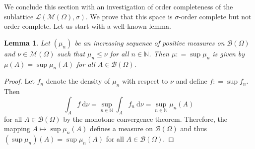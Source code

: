 \documentclass{amsart}
\numberwithin{equation}{section}
\newtheorem{lem}[thm]{Lemma}
\theoremstyle{remark}
\theoremstyle{definition}
\begin{document}
We conclude this section with an investigation of order completeness of 
the sublattice $\mathscr{L}(\mathscr{M}(\Omega),\sigma)$. 
We prove that this space is $\sigma$-order complete but not order complete.
Let us start with a well-known lemma.

\begin{lem}
\label{lem:monlimit}
	Let $(\mu_n)$ be an increasing sequence of positive measures on $\mathscr{B}(\Omega)$
	and $\nu\in\mathscr{M}(\Omega)$ such that
	$\mu_n \leq \nu$ for all $n\in{\mathds{N}}$.
	Then $\mu {\mathrel{\mathop:}=} \sup \mu_n$ is given by 
	$\mu(A) = \sup \mu_n(A)$ for all $A\in\mathscr{B}(\Omega)$.
\end{lem}
\begin{proof}
	Let $f_n$ denote the density of $\mu_n$ with respect to $\nu$ and define $f{\mathrel{\mathop:}=} \sup f_n$. Then
	\[ \int_A f {\:\mathrm{d}}\nu = \sup_{n\in{\mathds{N}}} \int_A f_n {\:\mathrm{d}}\nu = \sup_{n\in{\mathds{N}}} \mu_n(A)\]
	for all $A\in\mathscr{B}(\Omega)$ by the monotone convergence theorem. Therefore, the mapping $A\mapsto \sup \mu_n(A)$
	defines a measure on $\mathscr{B}(\Omega)$ and thus $(\sup \mu_n)(A) = \sup \mu_n(A)$ for all $A\in\mathscr{B}(\Omega)$.
	
	
	
	
	
	
	
	
	
	
	
	
	
	
	
	
	
\end{proof}
\end{document}
